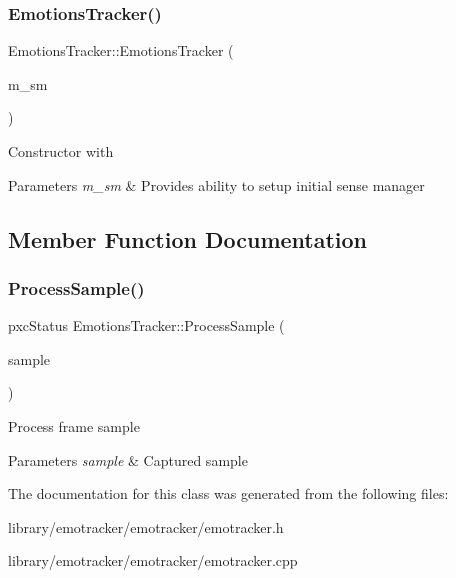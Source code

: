 \subsubsection{\texorpdfstring{Emotions\+Tracker()}{EmotionsTracker()}}
{\footnotesize\ttfamily Emotions\+Tracker\+::\+Emotions\+Tracker (\begin{DoxyParamCaption}\item[{P\+X\+C\+Sense\+Manager $\ast$}]{m\+\_\+sm }\end{DoxyParamCaption})}



Constructor with 


\begin{DoxyParams}{Parameters}
{\em m\+\_\+sm} & Provides ability to setup initial sense manager\\
\hline
\end{DoxyParams}


\subsection{Member Function Documentation}
\mbox{\label{class_emotions_tracker_ae0ab90b095ae541d2129b0d470f7d7ff}} 
\subsubsection{\texorpdfstring{Process\+Sample()}{ProcessSample()}}
{\footnotesize\ttfamily pxc\+Status Emotions\+Tracker\+::\+Process\+Sample (\begin{DoxyParamCaption}\item[{P\+X\+C\+Capture\+::\+Sample $\ast$}]{sample }\end{DoxyParamCaption})}



Process frame sample 


\begin{DoxyParams}{Parameters}
{\em sample} & Captured sample\\
\hline
\end{DoxyParams}


The documentation for this class was generated from the following files\+:\begin{DoxyCompactItemize}
\item 
library/emotracker/emotracker/emotracker.\+h\item 
library/emotracker/emotracker/emotracker.\+cpp\end{DoxyCompactItemize}
